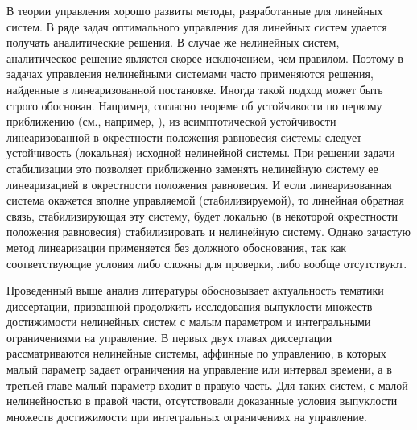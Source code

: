 \documentclass[../main.tex]{subfiles}
\begin{document}
В теории управления хорошо развиты методы, разработанные для линейных систем. 
В ряде задач оптимального управления для линейных систем удается получать аналитические решения. 
В случае же нелинейных систем, аналитическое решение является скорее исключением, чем правилом. 
Поэтому в задачах управления нелинейными системами часто применяются решения, найденные в линеаризованной постановке. 
Иногда такой подход может быть строго обоснован. 
Например, согласно теореме об устойчивости по первому приближению (см., например, \cite{Barbashin_book}), из асимптотической устойчивости линеаризованной в окрестности положения равновесия системы следует устойчивость (локальная) исходной нелинейной системы. 
При решении задачи стабилизации это позволяет приближенно заменять нелинейную систему ее линеаризацией в окрестности положения равновесия. 
И если линеаризованная система окажется вполне управляемой (стабилизируемой), то линейная обратная связь, стабилизирующая эту систему, будет локально (в некоторой окрестности положения равновесия) стабилизировать и нелинейную систему\cite{Kras_add, Stab_lectures, Khalil, Polyak_book}. 
Однако зачастую метод линеаризации применяется без должного обоснования, так как соответствующие условия либо сложны для проверки, либо вообще отсутствуют.

Проведенный выше анализ литературы обосновывает актуальность тематики диссертации, призванной продолжить исследования выпуклости множеств достижимости нелинейных систем с малым параметром и интегральными ограничениями на управление. 
В первых двух главах диссертации рассматриваются нелинейные системы, аффинные по управлению, в которых малый параметр задает ограничения на управление или интервал времени, а в третьей главе малый параметр входит в правую часть. 
Для таких систем, с малой нелинейностью в правой части, отсутствовали доказанные условия выпуклости множеств достижимости при интегральных ограничениях на управление.
\end{document}
